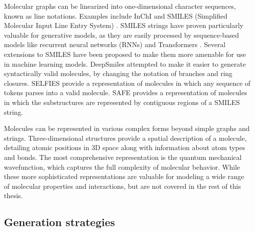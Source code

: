 Molecular graphs can be linearized into one-dimensional character sequences, known as line
notations. Examples include InChI \citep{hellerInChIIUPACInternational2015} and SMILES (Simplified
Molecular Input Line Entry System) \citep{weiningerSMILESChemicalLanguage1988}. SMILES strings have
proven particularly valuable for generative models, as they are easily processed by sequence-based
models like recurrent neural networks (RNNs) and Transformers \citep{vaswaniAttentionAllYou2017}.
Several extensions to SMILES have been proposed to make them more amenable for use in
machine learning models. DeepSmiles \citep{oboyleDeepSMILESAdaptationSMILES2018} attempted
to make it easier to generate syntactically valid molecules, by changing the notation of
branches and ring closures. SELFIES \citep{krennSELFIESFutureMolecular2022} provide a
representation of molecules in which any sequence of tokens parses into a valid molecule.
SAFE \citep{noutahiGottaBeSAFE2023} provides a representation of molecules in which the
substructures are represented by contiguous regions of a SMILES string.

Molecules can be represented in various complex forms beyond simple graphs and strings.
Three-dimensional structures provide a spatial description of a molecule, detailing atomic positions
in 3D space along with information about atom types and bonds. The most comprehensive representation
is the quantum mechanical wavefunction, which captures the full complexity of molecular behavior.
While these more sophisticated representations are valuable for modeling a wide range of molecular
properties and interactions, but are not covered in the rest of this thesis.

\subsection{Generation strategies}

